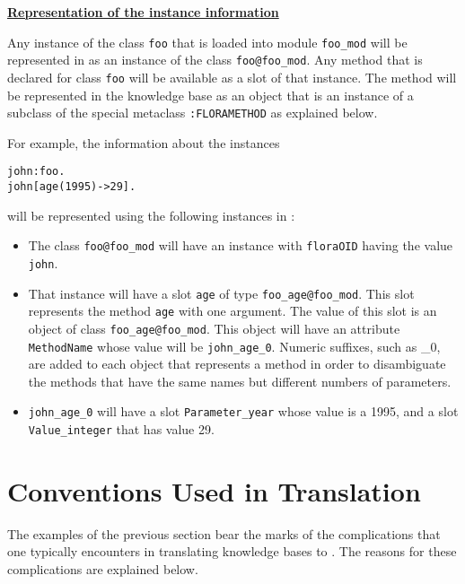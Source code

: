 \underline{{\bf Representation of the instance information}}

 Any instance of the \FLSYSTEM class {\tt foo} that is loaded into module
{\tt foo\_mod} will be represented in \Protege as an instance of
the class {\tt foo@foo\_mod}. Any method that is
declared for class {\tt foo}  will be
available as a slot of that instance. The method
will be represented in the \Protege knowledge base as an object that is
an instance of a subclass of
the special metaclass {\tt :FLORAMETHOD} as explained below.

For example, the information about the instances
\begin{verbatim}
john:foo.
john[age(1995)->29].
\end{verbatim}

will be represented using the following instances in \Protege:

\begin{itemize}
\item The \Protege class {\tt foo@foo\_mod} will have an instance with
{\tt floraOID}  having the value {\tt john}.
\item That instance
  will have a slot {\tt age}  of type {\tt foo\_age@foo\_mod}.
  This slot represents the \FLSYSTEM method {\tt age} with one argument.
  The value of this slot is an object of
  class {\tt foo\_age@foo\_mod}. This object will have an attribute
  {\tt MethodName} whose value will be {\tt john\_age\_0}.
  Numeric suffixes, such as \_0, are added to each object that represents
  a method in order to disambiguate the methods that have the
  same names but different numbers of parameters.
\item {\tt john\_age\_0} will have a slot {\tt Parameter\_year} whose value is a
  1995, and a slot {\tt Value\_integer} that has value 29.
\end{itemize}

\section{Conventions Used in Translation}
The examples of the previous section bear the marks of the complications
that one typically encounters in translating \FLSYSTEM
\FLSYSTEM knowledge bases to \Protege.
The reasons for these complications are explained below.

